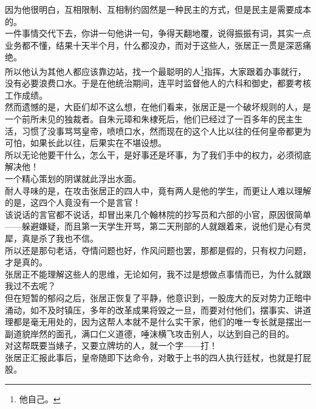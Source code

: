 \begin{multicols}{\theparacolNo}
因为他很明白，互相限制、互相制约固然是一种民主的方式，但是民主是需要成本的。\\

一件事情交代下去，你讲一句他讲一句，争得天翻地覆，说得振振有词，其实一点业务都不懂，结果十天半个月，什么都没办，而对于这些人，张居正一贯是深恶痛绝。\\

所以他认为其他人都应该靠边站，找一个最聪明的人\footnote{他自己。}指挥，大家跟着办事就行，没有必要浪费口水。于是在他统治期间，连平时监督他人的六科和御史，都要考核工作成绩。\\

然而遗憾的是，大臣们却不这么想，在他们看来，张居正是一个破坏规则的人，是一个前所未见的独裁者。自朱元璋和朱棣死后，他们已经过了一百多年的民主生活，习惯了没事骂骂皇帝，喷喷口水，然而现在的这个人比以往的任何皇帝都更为可怕，如果长此以往，后果实在不堪设想。\\

所以无论他要干什么，怎么干，是好事还是坏事，为了我们手中的权力，必须彻底解决他！\\

一个精心策划的阴谋就此浮出水面。\\

耐人寻味的是，在攻击张居正的四人中，竟有两人是他的学生，而更让人难以理解的是，这四个人竟没有一个是言官！\\

该说话的言官都不说话，却冒出来几个翰林院的抄写员和六部的小官，原因很简单——躲避嫌疑，而且第一天学生开骂，第二天刑部的人就跟着来，说他们是心有灵犀，真是杀了我也不信。\\

所以还是那句老话，夺情问题也好，作风问题也罢，那都是假的，只有权力问题，才是真的。\\

张居正不能理解这些人的思维，无论如何，我不过是想做点事情而已，为什么就跟我过不去呢？\\

但在短暂的郁闷之后，张居正恢复了平静，他意识到，一股庞大的反对势力正暗中涌动，如不及时镇压，多年的改革成果将毁之一旦，而要对付他们，摆事实、讲道理都是毫无用处的，因为这帮人本就不是什么实干家，他们的唯一专长就是摆出一副道貌岸然的面孔，满口仁义道德，唾沫横飞攻击别人，以达到自己的目的。\\

对这帮既要当婊子，又要立牌坊的人，就一个字——打！\\

张居正汇报此事后，皇帝随即下达命令，对敢于上书的四人执行廷杖，也就是打屁股。\\


\end{multicols}
